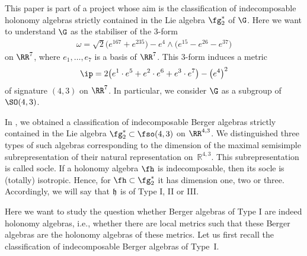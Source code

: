 This paper is part of a project whose aim is the classification of indecomposable holonomy algebras strictly contained in the Lie algebra $\fg^*_2$ of $\G$. Here we want to understand $\G$ as the stabiliser of the 3-form
\begin{gather}\label{Eomega1}
\omega=\sqrt 2\big(e^{167}+e^{235}\big)-e^4\wedge \big(e^{15}-e^{26}-e^{37}\big)
\end{gather}
on $\RR^7$, where $e_1,\dots,e_7$ is a basis of $\RR^7$. This 3-form induces a metric
\begin{gather}
\ip = 2\big(e^1\cdot e^5+e^2\cdot e^6+e^3\cdot e^7\big)- \big(e^4\big)^2 \label{Eip1}
\end{gather}
of signature $(4,3)$ on $\RR^7$. In particular, we consider $\G$ as a subgroup of $\SO(4,3)$.

In \cite{FK}, we obtained a classification of indecomposable Berger algebras strictly contained in the Lie algebra $\fg^*_2\subset \fso(4,3)$ on $\RR^{4,3}$. We distinguished three types of such algebras corresponding to the dimension of the maximal semisimple subrepresentation of their natural representation on~${\mathbb R}^{4,3}$. This subrepresentation is called socle. If a holonomy algebra $\fh$ is indecomposable, then its socle is (totally) isotropic. Hence, for $\fh\subset\fg_2^*$ it has dimension one, two or three. Accordingly, we will say that $\frak h$ is of Type I, II or III.

Here we want to study the question whether Berger algebras of Type I are indeed holonomy algebras, i.e., whether there are local metrics such that these Berger algebras are the holonomy algebras of these metrics. Let us first recall the classification of indecomposable Berger algebras of Type~I.

